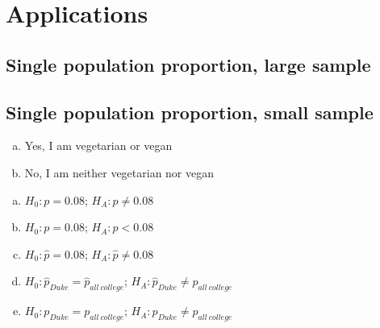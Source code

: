 \documentclass[11pt,containsverbatim,handout,xcolor=xelatex,dvipsnames,table]{beamer}
\newcommand{\solnMult}[1]{#1}
\begin{document}
\section{Applications}


\subsection{Single population proportion, large sample}


\begin{frame}

\vfill


\vfill

\end{frame}


\subsection{Single population proportion, small sample}


\begin{frame}


\begin{enumerate}[(a)]
\item Yes, I am vegetarian or vegan
\item No, I am neither vegetarian nor vegan
\end{enumerate}

\end{frame}


\begin{frame}


\begin{enumerate}[(a)]
\item \solnMult{$H_0: p = 0.08$; $H_A: p \ne 0.08$}
\item $H_0: p = 0.08$; $H_A: p < 0.08$
\item $H_0: \hat{p} = 0.08$; $H_A: \hat{p} \ne 0.08$
\item $H_0: \hat{p}_{Duke} = \hat{p}_{all~college}$; $H_A: \hat{p}_{Duke} \ne \hat{p}_{all~college}$
\item $H_0: p_{Duke} = p_{all~college}$; $H_A: p_{Duke} \ne p_{all~college}$
\end{enumerate}

\end{frame}
\end{document}
